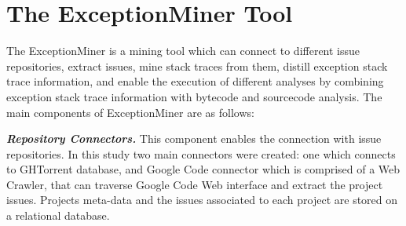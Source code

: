 \documentclass[conference]{IEEEtran}
\begin{document}




\section{The ExceptionMiner Tool}
\label{sec:exceptionminer}

The ExceptionMiner is a mining tool which can connect to different issue repositories, 
extract issues, mine stack traces from them, distill exception stack trace information,
and enable the execution of different analyses by combining exception stack 
trace information with bytecode and sourcecode analysis. The main components of ExceptionMiner are as follows:

\emph{\textbf{Repository Connectors.}} This component enables the connection 
with issue repositories. In this study two main connectors were created: one which connects to 
GHTorrent database, and Google Code connector which is comprised of a Web Crawler,
 that can traverse Google Code Web interface and extract the project issues. 
Projects meta-data and the issues associated to each project are stored on a relational 
database.
\end{document}
